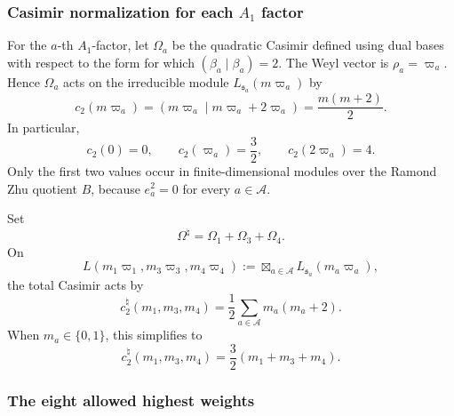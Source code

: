 \documentclass[11pt,reqno]{amsart}
\theoremstyle{definition}
\theoremstyle{remark}
\begin{document}
\subsubsection{Casimir normalization for each \texorpdfstring{\(A_1\)}{A1} factor}


For the \(a\)-th \(A_1\)-factor, let
\(\Omega_a\) be the quadratic Casimir defined using dual bases with
respect to the form for which
\((\beta_a\mid\beta_a)=2\).  The Weyl vector is \(\rho_a=\varpi_a\).
Hence \(\Omega_a\) acts on the irreducible module
\(L_{\mathfrak s_a}(m\varpi_a)\) by
\begin{equation*}
  c_2(m\varpi_a)
  =
  (m\varpi_a\mid m\varpi_a+2\varpi_a)
  =
  \frac{m(m+2)}2.
\end{equation*}
In particular,
\begin{equation*}
  c_2(0)=0,
  \qquad
  c_2(\varpi_a)=\frac32,
  \qquad
  c_2(2\varpi_a)=4.
\end{equation*}
Only the first two values occur in finite-dimensional modules over the
Ramond Zhu quotient \(B\), because
\(e_a^2=0\) for every \(a\in\mathcal A\).

Set
\begin{equation*}
  \Omega^\natural=\Omega_1+\Omega_3+\Omega_4.
\end{equation*}
On
\begin{equation*}
  L(m_1\varpi_1,m_3\varpi_3,m_4\varpi_4)
  :=
  \boxtimes_{a\in\mathcal A}
  L_{\mathfrak s_a}(m_a\varpi_a),
\end{equation*}
the total Casimir acts by
\begin{equation*}
  c_2^\natural(m_1,m_3,m_4)
  =
  \frac12
  \sum_{a\in\mathcal A}m_a(m_a+2).
\end{equation*}
When \(m_a\in\{0,1\}\), this simplifies to
\begin{equation*}
  c_2^\natural(m_1,m_3,m_4)
  =
  \frac32(m_1+m_3+m_4).
\end{equation*}

\subsubsection{The eight allowed highest weights}
\end{document}
